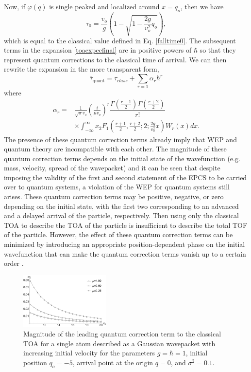 \documentclass[%
 reprint,
 amsmath,amssymb,
 aps,
]{revtex4-1}
\begin{document}
Now, if $\varphi(q)$ is single peaked and localized around $x=q_o$, then we have
\begin{equation}
\tau_{0}=\dfrac{v_o}{g} \left(1 - \sqrt{1-\dfrac{2 g}{v_o^2}q_o} \right),
\end{equation}
which is equal to the classical value defined in Eq. \eqref{falltime0}. The subsequent terms in the expansion \eqref{toaexpecfinal} are in positive powers of $\hbar$ so that they represent quantum corrections to the classical time of arrival. We can then rewrite the expansion in the more transparent form,
\begin{equation*}
    \bar{\tau}_{\text{quant}} = \tau_{class} + \sum_{r=1} \alpha_r \hbar^r
\end{equation*}
where 
\begin{align}
\alpha_r =& \frac{1}{\sqrt{\pi}v_o} \left(\frac{i }{\mu v_o}\right)^r \dfrac{\Gamma(\frac{r+1}{2})\Gamma(\frac{r+2}{2})}{r!} \nonumber \\
&\times \int_{-\infty}^{\infty} x {_2 F_1}\left(\frac{r+1}{2},\frac{r+2}{2};2;\frac{2g}{v_o^2}x\right) W_r(x) dx.
\end{align}
The presence of these quantum correction terms already imply that WEP and quantum theory are incompatible with each other. The magnitude of these quantum correction terms depends on the initial state of the wavefunction (e.g. mass, velocity, spread of the wavepacket) and it can be seen that despite imposing the validity of the first and second statement of the EPCS to be carried over to quantum systems, a violation of the WEP for quantum systems still arises. These quantum correction terms may be positive, negative, or zero depending on the initial state, with the first two corresponding to an advanced and a delayed arrival of the particle, respectively. Then using only the classical TOA to describe the TOA of the particle is insufficient to describe the total TOF of the particle. However, the effect of these quantum correction terms can be minimized by introducing an appropriate position-dependent phase on the initial wavefunction that can make the quantum correction terms vanish up to a certain order \cite{self}.


\begin{figure}[t]
	\centering
	\includegraphics[width = 0.4\textwidth]{mi_equal_mg_lead_overlay}
	\caption{Magnitude of the leading quantum correction term to the classical TOA for a single atom described as a Gaussian wavepacket with increasing initial velocity for the parameters $g=\hbar=1$, initial position $q_o=-5$, arrival point at the origin $q=0$, and $\sigma^2=0.1$.}
	\label{fig:mag_qcorr_plot}
\end{figure}
\end{document}
